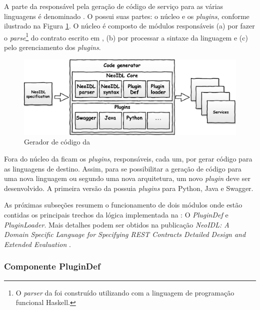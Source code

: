 A parte da \neoidl{} responsável pela geração de código de
serviço para as várias linguagens é denominado \framework{} \neoidl{}. O
\framework{} \neoidl{} possui suas partes: o núcleo e os \textit{plugins},
conforme ilustrado na Figura \ref{fig:programGenerator}.
O núcleo é composto de módulos responsáveis (a) por fazer o \textit{parse}\footnote{O \textit{parser} da \neoidl{}
foi construído utilizando \bnfc{} \cite{ranta-bnfc:2012} com a linguagem de
programação funcional Haskell.}
do contrato escrito em \neoidl{}, (b) por processar a sintaxe da linguagem \neoidl{} e (c) pelo gerenciamento dos \textit{plugins}.

\begin{figure}[h]
\begin{center}
\includegraphics[width=120mm,trim=0cm 0cm 0cm
0cm]{img/NeoIDLCodeGenerator.pdf}
\vspace{-.5cm}
\end{center}
\caption{Gerador de código da \neoidl{}}
\label{fig:programGenerator}
\end{figure}

Fora do núcleo da \neoidl{} ficam os \textit{plugins}, responsáveis,
cada um, por gerar código para as linguagens de destino. Assim, para se
possibilitar a geração de código para uma nova linguagem ou segundo uma nova arquitetura, um
novo \textit{plugin} deve ser desenvolvido. A primeira versão da \neoidl{}
possuia \textit{plugins} para Python, Java e Swagger.

As próximas subseções resumem o funcionamento de
dois módulos onde estão contidas os principais trechos da lógica implementada na \neoidl{}: O
\textit{PluginDef} e \textit{PluginLoader}. Mais detalhes podem ser obtidos na
publicação \textit{NeoIDL: A Domain Specific Language for Specifying REST
Contracts Detailed Design and Extended Evaluation} \cite{lima2015neoidl}.
 

\subsubsection{Componente PluginDef}{\label{sec:plugindef}}

